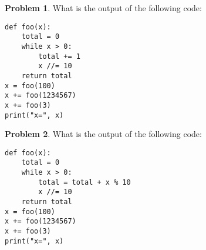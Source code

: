 \documentclass[10pt]{article}
\theoremstyle{definition}
\newtheorem{problem}{Problem}
\begin{document}
\begin{problem}
    What is the output of the following code:
\end{problem}
\begin{lstlisting}
def foo(x):
    total = 0
    while x > 0:
        total += 1
        x //= 10
    return total
x = foo(100)
x += foo(1234567)
x += foo(3)
print("x=", x)
\end{lstlisting}
\vspace{0.15in}

\begin{problem}
    What is the output of the following code:
\end{problem}
\begin{lstlisting}
def foo(x):
    total = 0
    while x > 0:
        total = total + x % 10
        x //= 10
    return total
x = foo(100)
x += foo(1234567)
x += foo(3)
print("x=", x)
\end{lstlisting}
\vspace{0.15in}
\end{document}
